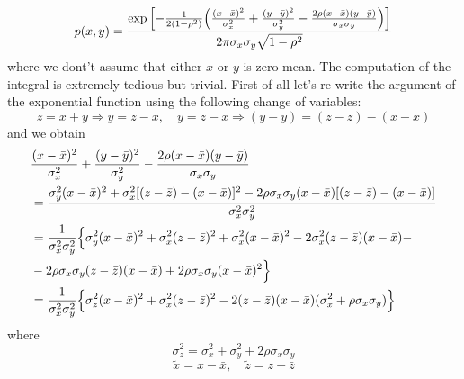 \documentclass{article}
\begin{document}
\begin{equation}
    p(x,y) = \frac{\exp{\Bigl[-\frac{1}{2(1-\rho^2)}
                        \Bigl(
                            \frac{(x-\bar x)^2}{\sigma_x^2} +
                            \frac{(y-\bar y)^2}{\sigma_y^2} -
                            \frac{2\rho(x-\bar x)(y-\bar y)}{\sigma_x \sigma_y}
                        \Bigr) \Bigr]
                        }
                  }
    {2\pi \sigma_x \sigma_y \sqrt{1-\rho^2}}
\end{equation}
where we dont't assume that either $x$ or $y$ is zero-mean. The computation of the integral is extremely tedious but trivial. First of all let's re-write the argument of the exponential function using the following change of variables:
\begin{equation}
    z = x + y \Rightarrow y = z - x, \quad \bar y = \bar z - \bar x \Rightarrow (y - \bar y) = (z -\bar z) - (x - \bar x)
\end{equation}
and we obtain
\begin{equation}
    \begin{split}
        &
        \frac{(x-\bar x)^2}{\sigma_x^2} +
        \frac{(y-\bar y)^2}{\sigma_y^2} -
        \frac{2\rho(x-\bar x)(y-\bar y)}{\sigma_x \sigma_y} \\
        & =
        \frac{\sigma^2_y (x-\bar x)^2 + \sigma^2_x [(z-\bar z) - (x -\bar x)]^2 - 2 \rho \sigma_x \sigma_y (x - \bar x)[(z-\bar z) - (x -\bar x)]}
        {\sigma^2_x \sigma^2_y} \\
        & = \frac{1}{\sigma^2_x \sigma^2_y} 
        \Bigl\{
        \sigma^2_y(x-\bar x)^2 + \sigma^2_x(z-\bar z)^2 + \sigma^2_x(x-\bar x)^2 - 2 \sigma^2_x (z-\bar z)(x - \bar x) - \\
        & - 2 \rho \sigma_x \sigma_y (z - \bar z)(x - \bar x) + 2 \rho \sigma_x \sigma_y (x- \bar x)^2
        \Bigr\} \\
        & = \frac{1}{\sigma^2_x \sigma^2_y}
        \Bigl\{
        \sigma^2_z (x - \bar x)^2 + \sigma^2_x (z-\bar z)^2 -2(z-\bar z)(x-\bar x)(\sigma^2_x + \rho \sigma_x \sigma_y)
        \Bigr\}
    \end{split}
\end{equation}
where
\begin{equation}
    \sigma_z^2 = \sigma_x^2 + \sigma_y^2 + 2 \rho \sigma_x \sigma_y
\end{equation}
\begin{equation}
    \tilde x = x - \bar x, \quad \tilde z = z - \bar z
\end{equation}
\end{document}
